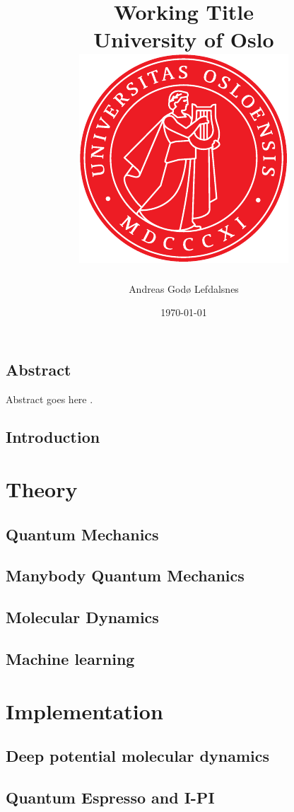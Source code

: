 \documentclass[12pt]{report}
\title{
{Working Title}\\
{\Large University of Oslo}\\
{\includegraphics{uio.pdf}}
}
\author{Andreas Godø Lefdalsnes}
\date{\today}
\begin{document}
\maketitle

\chapter*{Abstract}
Abstract goes here \parencite[e.g.][page 300]{einstein}.
 
\tableofcontents

\chapter{Introduction}


\part{Theory}
 
\chapter{Quantum Mechanics}


\chapter{Manybody Quantum Mechanics}

 
\chapter{Molecular Dynamics}

 
\chapter{Machine learning}


\part{Implementation}

\chapter{Deep potential molecular dynamics}

\chapter{Quantum Espresso and I-PI}
\end{document}
